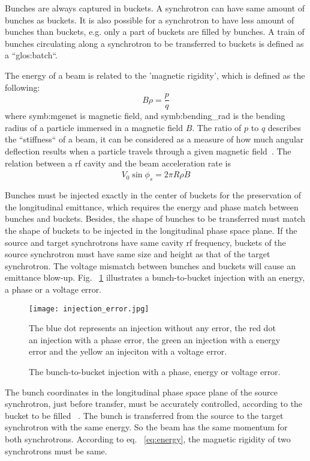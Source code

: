 Bunches are always captured in buckets. A synchrotron can have same amount of bunches as buckets. It is also possible for a synchrotron to have less amount of bunches than buckets, e.g. only a part of buckets are filled by bunches. A train of bunches circulating along a synchrotron to be transferred to buckets is defined as a ``\gls{glos:batch}``.

The energy of a beam is related to the 'magnetic rigidity', which is defined as the following:
\begin{equation}
	\label{eq:energy}
	B\rho =\frac{p}{q}
\end{equation}
where \gls{symb:mgenet} is magnetic field, and \gls{symb:bending_rad} is the bending radius of a particle immersed in a magnetic field $B$. The ratio of $p$ to $q$ describes the ``stiffness`` of a beam, it can be considered as a measure of how much angular deflection results when a particle travels through a given magnetic field~\cite{barletta_overview_????}. The relation between a rf cavity and the beam acceleration rate is
\begin{equation}
	\label{eq:rf_acceleration}
	V_0\sin\phi_s=2\pi R\rho\dot{B}
\end{equation}

Bunches must be injected exactly in the center of buckets for the preservation of the longitudinal emittance, which requires the energy and phase match between bunches and buckets. Besides, the shape of bunches to be transferred must match the shape of buckets to be injected in the longitudinal phase space plane. If the source and target synchrotrons have same cavity rf frequency, buckets of the source synchrotron must have same size and height as that of the target synchrotron. The voltage mismatch between bunches and buckets will cause an emittance blow-up. Fig. ~\ref{injection_error} illustrates a bunch-to-bucket injection with an energy, a phase or a voltage error. 
\begin{figure}[!htb]
   \centering   
   \texttt{[image: injection\_error.jpg]}
   \caption{The bunch-to-bucket injection with a phase, energy or voltage error.}{The blue dot represents an injection without any error, the red dot an injection with a phase error, the green an injection with a energy error and the yellow an injeciton with a voltage error.}
   \label{injection_error}
\end{figure} 

The bunch coordinates in the longitudinal phase space plane of the source synchrotron, just before transfer, must be accurately controlled, according to the bucket to be filled ~\cite{garoby_timing_1984}. The bunch is transferred from the source to the target synchrotron with the same energy. So the beam has the same momentum for both synchrotrons. According to eq. ~\ref{eq:energy}, the magnetic rigidity of two synchrotrons must be same.


